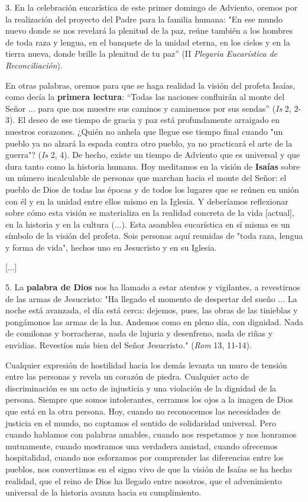3. En la celebración eucarística de este primer domingo de Adviento,
oremos por la realización del proyecto del Padre para la familia humana:
"En ese mundo nuevo donde se nos revelará la plenitud de la paz, reúne
también a los hombres de toda raza y lengua, en el banquete de la unidad
eterna, en los cielos y en la tierra nueva, donde brille la plenitud de
tu paz'' (II \emph{Plegaria Eucarística de Reconciliación}).

En otras palabras, oremos para que se haga realidad la visión del
profeta Isaías, como decía la \textbf{primera lectura}: ``Todas las
naciones confluirán al monte del Señor ... para que nos muestre sus
caminos y caminemos por sus sendas'' (\emph{Is} 2, 2-3). El deseo de ese
tiempo de gracia y paz está profundamente arraigado en nuestros
corazones. ¿Quién no anhela que llegue ese tiempo final cuando "un
pueblo ya no alzará la espada contra otro pueblo, ya no practicará el
arte de la guerra"? (\emph{Is} 2, 4). De hecho, existe un tiempo de
Adviento que es universal y que dura tanto como la historia humana. Hoy
meditamos en la visión de \textbf{Isaías} sobre un número incalculable
de personas que marchan hacia el monte del Señor: el pueblo de Dios de
todas las épocas y de todos los lugares que se reúnen en unión con él y
en la unidad entre ellos mismo en la Iglesia. Y deberíamos reflexionar
sobre cómo esta visión se materializa en la realidad concreta de la vida
{[}actual{]}, en la historia y en la cultura (...). Esta asamblea
eucarística en sí misma es un símbolo de la visión del profeta. Sois
personas aquí reunidas de "toda raza, lengua y forma de vida", hechos
uno en Jesucristo y en su Iglesia.

{[}...{]}

5. La \textbf{palabra de Dios} nos ha llamado a estar atentos y
vigilantes, a revestirnos de las armas de Jesucristo: "Ha llegado el
momento de despertar del sueño ... La noche está avanzada, el día está
cerca: dejemos, pues, las obras de las tinieblas y pongámonos las armas
de la luz. Andemos como en pleno día, con dignidad. Nada de comilonas y
borracheras, nada de lujuria y desenfreno, nada de riñas y envidias.
Revestíos más bien del Señor Jesucristo." (\emph{Rom} 13, 11-14).

Cualquier expresión de hostilidad hacia los demás levanta un muro de
tensión entre las personas y revela un corazón de piedra. Cualquier acto
de discriminación es un acto de injusticia y una violación de la
dignidad de la persona. Siempre que somos intolerantes, cerramos los
ojos a la imagen de Dios que está en la otra persona. Hoy, cuando no
reconocemos las necesidades de justicia en el mundo, no captamos el
sentido de solidaridad universal. Pero cuando hablamos con palabras
amables, cuando nos respetamos y nos honramos mutuamente, cuando
mostramos una verdadera amistad, cuando ofrecemos hospitalidad, cuando
nos esforzamos por comprender las diferencias entre los pueblos, nos
convertimos en el signo vivo de que la visión de Isaías se ha hecho
realidad, que el reino de Dios ha llegado entre nosotros, que el
advenimiento universal de la historia avanza hacia su cumplimiento.

